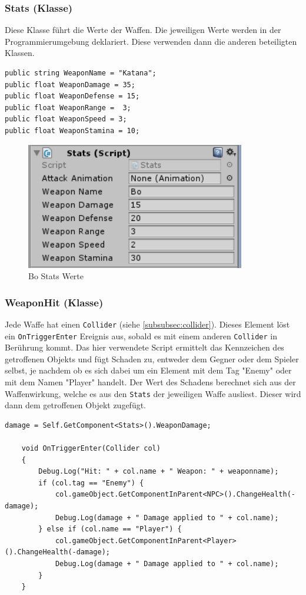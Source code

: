 \subsubsection{Stats (Klasse)}
Diese Klasse führt die Werte der Waffen. Die jeweiligen Werte werden in der Programmierumgebung deklariert. Diese verwenden dann die anderen beteiligten Klassen.

\begin{lstlisting}
public string WeaponName = "Katana";
public float WeaponDamage = 35;
public float WeaponDefense = 15;
public float WeaponRange =	3;
public float WeaponSpeed = 3;
public float WeaponStamina = 10;
\end{lstlisting}

\begin{figure}[H]
\includegraphics[scale=1]{screenshots/bostats.png}
\caption{Bo Stats Werte}
\end{figure}

\subsubsection{WeaponHit (Klasse)}
Jede Waffe hat einen \lstinline{Collider} (siehe \cref{subsubsec:collider}). Dieses Element löst ein \lstinline{OnTriggerEnter} Ereignis aus, sobald es mit einem anderen \lstinline{Collider} in Berührung kommt.
Das hier verwendete Script ermittelt das Kennzeichen des getroffenen Objekts und fügt Schaden zu, entweder dem Gegner oder dem Spieler selbst, je nachdem ob es sich dabei um ein Element mit dem Tag "Enemy" oder mit dem Namen "Player" handelt. %
Der Wert des Schadens berechnet sich aus der Waffenwirkung, welche es aus den \lstinline{Stats} der jeweiligen Waffe ausliest. Dieser wird dann dem getroffenen Objekt zugefügt.

\begin{lstlisting}[caption={Waffentreffer}]
damage = Self.GetComponent<Stats>().WeaponDamage;

	void OnTriggerEnter(Collider col)
	{
		Debug.Log("Hit: " + col.name + " Weapon: " + weaponname);
		if (col.tag == "Enemy") {
			col.gameObject.GetComponentInParent<NPC>().ChangeHealth(-damage);
			Debug.Log(damage + " Damage applied to " + col.name);
		} else if (col.name == "Player") {
			col.gameObject.GetComponentInParent<Player>().ChangeHealth(-damage);
			Debug.Log(damage + " Damage applied to " + col.name);
		}
	}
\end{lstlisting}

